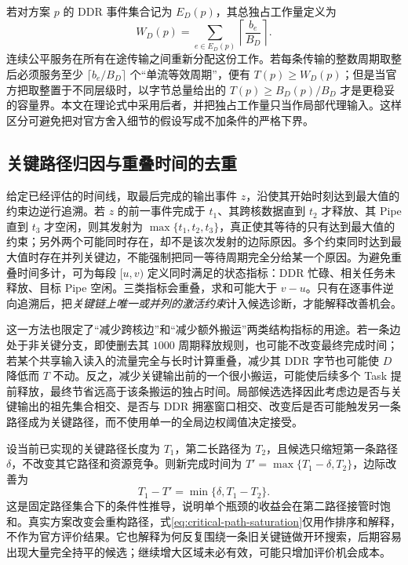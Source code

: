 若对方案 $p$ 的 DDR 事件集合记为 $E_D(p)$，其总独占工作量定义为
\begin{equation}\label{eq:ddr-exclusive-total}
W_D(p)=\sum_{e\in E_D(p)}\left\lceil\frac{b_e}{B_D}\right\rceil.
\end{equation}
连续公平服务在所有在途传输之间重新分配这份工作。若每条传输的整数周期取整后必须服务至少 $\lceil b_e/B_D\rceil$ 个“单流等效周期”，便有 $T(p)\ge W_D(p)$；但是当官方把取整置于不同层级时，以字节总量给出的 $T(p)\ge B_D(p)/B_D$ 才是更稳妥的容量界。本文在理论式中采用后者，并把独占工作量只当作局部代理输入。这样区分可避免把对官方舍入细节的假设写成不加条件的严格下界。

\subsection{关键路径归因与重叠时间的去重}
给定已经评估的时间线，取最后完成的输出事件 $z$，沿使其开始时刻达到最大值的约束边逆行追溯。若 $z$ 的前一事件完成于 $t_1$、其跨核数据直到 $t_2$ 才释放、其 Pipe 直到 $t_3$ 才空闲，则其发射为 $\max\{t_1,t_2,t_3\}$，真正使其等待的只有达到最大值的约束；另外两个可能同时存在，却不是该次发射的边际原因。多个约束同时达到最大值时存在并列关键边，不能强制把同一等待周期完全分给某一个原因。为避免重叠时间多计，可为每段 $[u,v)$ 定义同时满足的状态指标：DDR 忙碌、相关任务未释放、目标 Pipe 空闲。三类指标会重叠，求和可能大于 $v-u$。只有在逐事件逆向追溯后，把\emph{关键链上唯一或并列的激活约束}计入候选诊断，才能解释改善机会。

这一方法也限定了“减少跨核边”和“减少额外搬运”两类结构指标的用途。若一条边处于非关键分支，即使删去其 $1000$ 周期释放规则，也可能不改变最终完成时间；若某个共享输入读入的流量完全与长时计算重叠，减少其 DDR 字节也可能使 $D$ 降低而 $T$ 不动。反之，减少关键输出前的一个很小搬运，可能使后续多个 Task 提前释放，最终节省远高于该条搬运的独占时间。局部候选选择因此考虑边是否与关键输出的祖先集合相交、是否与 DDR 拥塞窗口相交、改变后是否可能触发另一条路径成为关键路径，而不使用单一的全局边权阈值决定接受。

设当前已实现的关键路径长度为 $T_1$，第二长路径为 $T_2$，且候选只缩短第一条路径 $\delta$，不改变其它路径和资源竞争。则新完成时间为 $T'=\max\{T_1-\delta,T_2\}$，边际改善为
\begin{equation}\label{eq:critical-path-saturation}
T_1-T'=\min\{\delta,T_1-T_2\}.
\end{equation}
这是固定路径集合下的条件性推导，说明单个瓶颈的收益会在第二路径接管时饱和。真实方案改变会重构路径，式\eqref{eq:critical-path-saturation}仅用作排序和解释，不作为官方评价结果。它也解释为何反复围绕一条旧关键链做开环搜索，后期容易出现大量完全持平的候选；继续增大区域未必有效，可能只增加评价机会成本。

